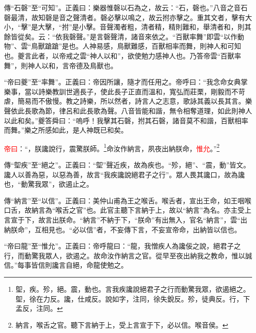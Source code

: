 {\noindent\zhuan{}\fzbyks 傳“石磬”至“可知”。正義曰：樂器惟磬以石為之，故云：“石，磬也。”八音之音石磬最清，故知磬是音之聲清者。磬必擊以鳴之，故云拊亦擊之。重其文者，擊有大小，“擊”是大擊，“拊”是小擊。音聲濁者粗，清者精，精則難和，舉清者和，則其餘皆從矣。云：“依我磬聲。”是言磬聲清，諸音來依之。“百獸率舞”即雲“以作動物”、雲“鳥獸蹌蹌”是也。人神易感，鳥獸難感，百獸相率而舞，則神人和可知也。夔言此者，以帝戒之雲“神人以和”，欲使勉力感神人也。乃答帝雲“百獸率舞”，則神人以和，言帝德及鳥獸也。 \par}

{\noindent\shu{}\fzkt “帝曰夔”至“率舞”。正義曰：帝因所讓，隨才而任用之。帝呼曰：“我念命女典掌樂事，當以詩樂教訓世適長子，使此長子正直而溫和，寬弘而莊栗，剛毅而不苛虐，簡易而不傲慢。教之詩樂，所以然者，詩言人之志意，歌詠其義以長其言。樂聲依此長歌為節，律呂和此長歌為聲。八音皆能和諧，無令相奪道理，如此則神人以此和矣。”夔答舜曰：“嗚呼！我擊其石磬，拊其石磬，諸音莫不和諧，百獸相率而舞。”樂之所感如此，是人神既已和矣。 \par}

\textcolor{red}{帝曰}：“，朕讒說行，震驚朕師。\footnote{堲，疾。殄，絕。震，動也。言我疾讒說絕君子之行而動驚我眾，欲遏絕之。堲，徐在力反。讒，仕咸反。說如字，注同，徐失銳反。殄，徒典反。行，下孟反，注同。}命汝作納言，夙夜出納朕命，\textcolor{red}{惟允}。”\footnote{納言，喉舌之官。聽下言納于上，受上言宣于下，必以信。喉音侯。}

{\noindent\zhuan{}\fzbyks 傳“堲疾”至“絕之”。正義曰：“堲”聲近疾，故為疾也。“殄，絕”、“震，動”皆文。讒人以善為惡，以惡為善，故言“我疾讒說絕君子之行”。眾人畏其讒口，故為讒也，“動驚我眾”，欲遏止之。 \par}

{\noindent\zhuan{}\fzbyks 傳“納言”至“以信”。正義曰：美仲山甫為王之喉舌。喉舌者，宣出王命，如王咽喉口舌，故納言為“喉舌之官”也。此官主聽下言納于上，故以“納言”為名。亦主受上言宣于下，故言出朕命。“納言”不納于下，“朕命”有出無入，官名“納言”，雲“出納朕命”，互相見也。“必以信”者，不妄傳下言，不妄宣帝命，出納皆以信也。 \par}

{\noindent\shu{}\fzkt “帝曰龍”至“惟允”。正義曰：帝呼龍曰：“龍，我憎疾人為讒佞之說，絕君子之行，而動驚我眾人，欲遏之。故命汝作納言之官。從早至夜出納我之教命，惟以誠信。”每事皆信則讒言自絕，命龍使勉之。 \par}

